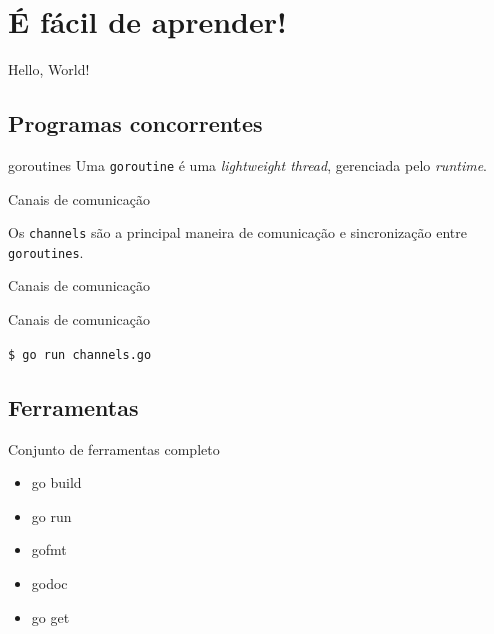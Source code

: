 \documentclass{beamer}
\begin{document}
\section{É fácil de aprender!}
\begin{frame}[fragile]
    {Hello, World!}

    
\end{frame}

\subsection{Programas concorrentes}
\begin{frame}
    {goroutines}
    Uma {\tt goroutine} é uma {\em lightweight thread}, gerenciada pelo {\em runtime}.
\end{frame}

\begin{frame}
    {Canais de comunicação}

    Os {\tt channels} são a principal maneira de comunicação e sincronização
    entre {\tt goroutines}.
\end{frame}

\begin{frame}[fragile]
    {Canais de comunicação}

    
\end{frame}

\begin{frame}[fragile]
    {Canais de comunicação}

    \verb|$ go run channels.go|
    
\end{frame}

\subsection{Ferramentas}
\begin{frame}
    {Conjunto de ferramentas completo}
    \begin{itemize}[<+->]
        \item go build
        \item go run
        \item gofmt
        \item godoc
        \item go get
    \end{itemize}
\end{frame}
\end{document}
